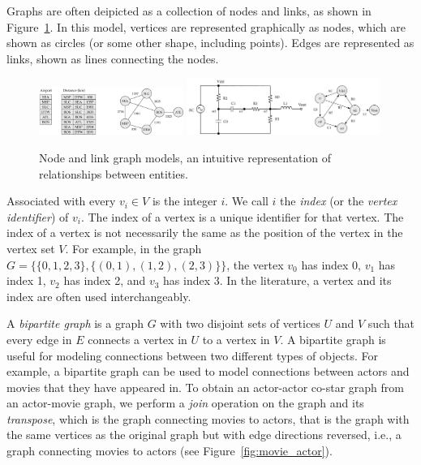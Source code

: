 Graphs are often deipicted as a collection of nodes and links, as shown in
Figure~\ref{fig:node_link_graphs}. In this model, vertices are
represented graphically as nodes, which are
shown as circles (or some other shape, including points). Edges are represented as links,
shown as lines connecting the nodes.


\begin{figure}[ht]
  \begin{center}
    {\includegraphics[width=0.42\textwidth]{figs/airport.pdf}}
    {\includegraphics[width=0.56\textwidth]{figs/circuit.pdf}}
    \caption{Node and link graph models, an intuitive representation of relationships between entities.\label{fig:node_link_graphs}}
  \end{center}
\end{figure}

Associated with every $v_i \in V$ is the integer $i$. We call $i$ the \emph{index}
(or the \emph{vertex identifier}) of $v_i$. The index of a vertex is a unique
identifier for that vertex. The index of a vertex is not necessarily the same
as the position of the vertex in the vertex set $V$. For example, in the graph
$G = \{ \{ 0, 1, 2, 3 \}, \{ (0, 1), (1, 2), (2, 3) \} \}$, the vertex $v_0$ has index 0,
$v_1$ has index 1, $v_2$ has index 2, and $v_3$ has index 3. In the literature,
a vertex and its index are often used interchangeably.


A \emph{bipartite graph} is a graph $G$ with two disjoint sets of
vertices $U$ and $V$ such that every edge in $E$ connects a vertex
in $U$ to a vertex in $V$. A bipartite graph is useful for modeling
connections between two different types of objects. For example,
a bipartite graph can be used to model connections between
actors and movies that they have appeared in. To obtain
an actor-actor co-star graph from an actor-movie graph, we
perform a \emph{join} operation on the graph and its \emph{transpose}, which is
the graph connecting movies to actors, that is the graph with the same
vertices as the original graph but with edge directions reversed, i.e., a graph
connecting movies to actors (see Figure~\ref{fig:movie_actor}).

